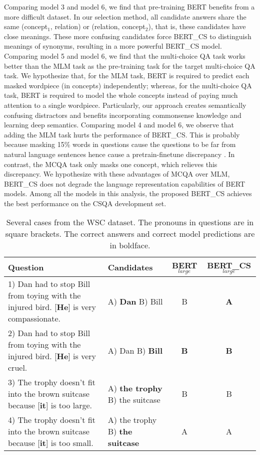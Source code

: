 \documentclass[11pt,a4paper]{article}
\begin{document}
Comparing model 3 and model 6, we find that pre-training BERT benefits from a more difficult dataset.  In our selection method, all candidate answers share the same (concept$_1$, relation) or (relation, concept$_2$), that is, these candidates have close meanings. These more confusing candidates force BERT\_CS to distinguish meanings of synonyms, resulting in a more powerful BERT\_CS model.
Comparing model 5 and model 6, we find that the multi-choice QA task works better than the MLM task as the pre-training task for the target multi-choice QA task. 
We hypothesize that, for the MLM task, BERT is required to predict each masked wordpiece (in concepts) independently; whereas, for the multi-choice QA task, BERT is required to model the whole concepts instead of paying much attention to a single wordpiece. Particularly, our approach creates semantically confusing distractors and benefits incorporating commonsense knowledge and learning deep semantics.
Comparing model 4 and model 6, we observe that adding the MLM task hurts the performance of BERT\_CS. This is probably because masking 15\% words in questions cause the questions to be far from natural language sentences hence cause a pretrain-finetune discrepancy \citep{yang2019xlnet}. In contrast, the MCQA task only masks one concept, which relieves this discrepancy. We hypothesize with these advantages of MCQA over MLM, BERT\_CS does not degrade the language representation capabilities of BERT models. 
Among all the models in this analysis, the proposed BERT\_CS achieves the best performance on the CSQA development set.

\begin{table*}[t!]
	\begin{center}
		\small
		\begin{tabular}{p{8cm}|p{1.95cm}|c|c}
			\toprule
            \textbf{Question}   & \textbf{Candidates}  & \textbf{BERT}$_{large}$       & \textbf{BERT\_CS}$_{large}$  \\
            \midrule
            1) Dan had to stop Bill from toying with the injured bird. [\textbf{He}] is very compassionate.
            &A) \textbf{Dan}  B) Bill 
            & B & \textbf{A} \\
            \midrule
            2) Dan had to stop Bill from toying with the injured bird. [\textbf{He}] is very cruel.
            &A) Dan B) \textbf{Bill}
            & \textbf{B} & \textbf{B} \\
            \midrule
            3) The trophy doesn't fit into the brown suitcase because [\textbf{it}] is too large.
            &A) \textbf{the trophy} B) the suitcase
            & B    & B  \\
            \midrule
            4) The trophy doesn't fit into the brown suitcase because [\textbf{it}] is too small.   
            &A) the trophy B) \textbf{the suitcase}
            & A    & A  \\
			\bottomrule
		\end{tabular}
	\end{center}
	\caption{Several cases from the WSC dataset. The pronouns in questions are in square brackets. The correct answers and correct model predictions are in boldface.}
	\label{tab:case_study}
\end{table*}
\end{document}
